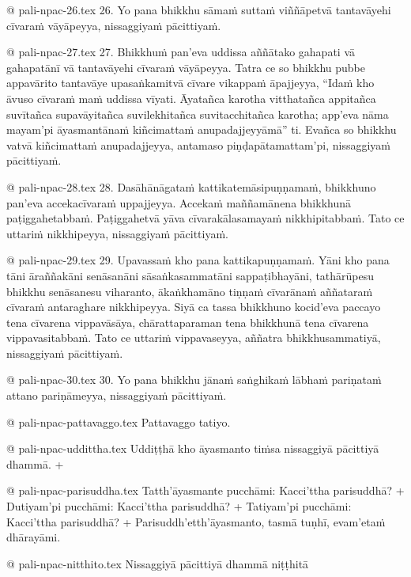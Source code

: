 @ pali-npac-26.tex
26. Yo pana bhikkhu sāmaṁ suttaṁ viññāpetvā tantavāyehi cīvaraṁ vāyāpeyya, nissaggiyaṁ pācittiyaṁ.

@ pali-npac-27.tex
27. Bhikkhuṁ pan’eva uddissa aññātako gahapati vā gahapatānī vā tantavāyehi cīvaraṁ vāyāpeyya. Tatra ce so bhikkhu pubbe appavārito tantavāye upasaṅkamitvā cīvare vikappaṁ āpajjeyya, “Idaṁ kho āvuso cīvaraṁ maṁ uddissa vīyati. Āyatañca karotha vitthatañca appitañca suvītañca supavāyitañca suvilekhitañca suvitacchitañca karotha; app’eva nāma mayam’pi āyasmantānaṁ kiñcimattaṁ anupadajjeyyāmā” ti. Evañca so bhikkhu vatvā kiñcimattaṁ anupadajjeyya, antamaso piṇḍapātamattam’pi, nissaggiyaṁ pācittiyaṁ.

@ pali-npac-28.tex
28. Dasāhānāgataṁ kattikatemāsipuṇṇamaṁ, bhikkhuno pan’eva accekacīvaraṁ uppajjeyya. Accekaṁ maññamānena bhikkhunā paṭiggahetabbaṁ. Paṭiggahetvā yāva cīvarakālasamayaṁ nikkhipitabbaṁ. Tato ce uttariṁ nikkhipeyya, nissaggiyaṁ pācittiyaṁ.

@ pali-npac-29.tex
29. Upavassaṁ kho pana kattikapuṇṇamaṁ. Yāni kho pana tāni āraññakāni senāsanāni sāsaṅkasammatāni sappaṭibhayāni, tathārūpesu bhikkhu senāsanesu viharanto, ākaṅkhamāno tiṇṇaṁ cīvarānaṁ aññataraṁ cīvaraṁ antaraghare nikkhipeyya. Siyā ca tassa bhikkhuno kocid’eva paccayo tena cīvarena vippavāsāya, chārattaparaman tena bhikkhunā tena cīvarena vippavasitabbaṁ. Tato ce uttariṁ vippavaseyya, aññatra bhikkhusammatiyā, nissaggiyaṁ pācittiyaṁ.

@ pali-npac-30.tex
30. Yo pana bhikkhu jānaṁ saṅghikaṁ lābhaṁ pariṇataṁ attano pariṇāmeyya, nissaggiyaṁ pācittiyaṁ.

@ pali-npac-pattavaggo.tex
Pattavaggo tatiyo.

@ pali-npac-uddittha.tex
Uddiṭṭhā kho āyasmanto tiṁsa nissaggiyā pācittiyā dhammā. +

@ pali-npac-parisuddha.tex
Tatth’āyasmante pucchāmi: Kacci’ttha parisuddhā? +
Dutiyam’pi pucchāmi: Kacci’ttha parisuddhā? +
Tatiyam’pi pucchāmi: Kacci’ttha parisuddhā? +
Parisuddh’etth’āyasmanto, tasmā tuṇhī, evam’etaṁ dhārayāmi.

@ pali-npac-nitthito.tex
Nissaggiyā pācittiyā dhammā niṭṭhitā
